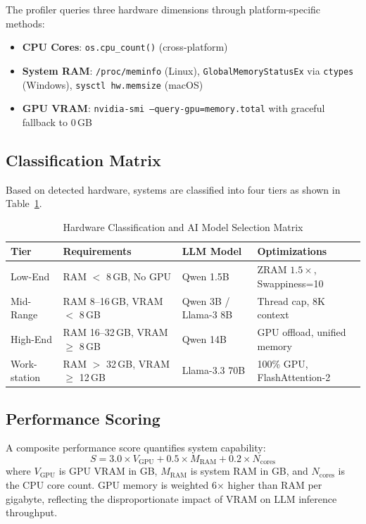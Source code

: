 \documentclass[conference]{IEEEtran}
\begin{document}
The profiler queries three hardware dimensions through platform-specific methods:

\begin{itemize}
    \item \textbf{CPU Cores}: \texttt{os.cpu\_count()} (cross-platform)
    \item \textbf{System RAM}: \texttt{/proc/meminfo} (Linux), \texttt{GlobalMemoryStatusEx} via \texttt{ctypes} (Windows), \texttt{sysctl hw.memsize} (macOS)
    \item \textbf{GPU VRAM}: \texttt{nvidia-smi --query-gpu=memory.total} with graceful fallback to 0\,GB
\end{itemize}

\subsection{Classification Matrix}

Based on detected hardware, systems are classified into four tiers as shown in Table~\ref{tab:tiers}.

\begin{table}[htbp]
\caption{Hardware Classification and AI Model Selection Matrix}
\label{tab:tiers}
\centering
\renewcommand{\arraystretch}{1.2}
\begin{tabular}{@{}p{1.2cm}p{1.8cm}p{2.0cm}p{2.0cm}@{}}
\toprule
\textbf{Tier} & \textbf{Requirements} & \textbf{LLM Model} & \textbf{Optimizations} \\
\midrule
Low-End & RAM $<$ 8\,GB, No GPU & Qwen 1.5B & ZRAM $1.5\times$, Swappiness=10 \\
\addlinespace
Mid-Range & RAM 8--16\,GB, VRAM $<$ 8\,GB & Qwen 3B / Llama-3 8B & Thread cap, 8K context \\
\addlinespace
High-End & RAM 16--32\,GB, VRAM $\geq$ 8\,GB & Qwen 14B & GPU offload, unified memory \\
\addlinespace
Work-station & RAM $>$ 32\,GB, VRAM $\geq$ 12\,GB & Llama-3.3 70B & 100\% GPU, FlashAttention-2 \\
\bottomrule
\end{tabular}
\end{table}

\subsection{Performance Scoring}

A composite performance score quantifies system capability:
\begin{equation}
S = 3.0 \times V_{\text{GPU}} + 0.5 \times M_{\text{RAM}} + 0.2 \times N_{\text{cores}}
\end{equation}
where $V_{\text{GPU}}$ is GPU VRAM in GB, $M_{\text{RAM}}$ is system RAM in GB, and $N_{\text{cores}}$ is the CPU core count. GPU memory is weighted 6$\times$ higher than RAM per gigabyte, reflecting the disproportionate impact of VRAM on LLM inference throughput.
\end{document}
